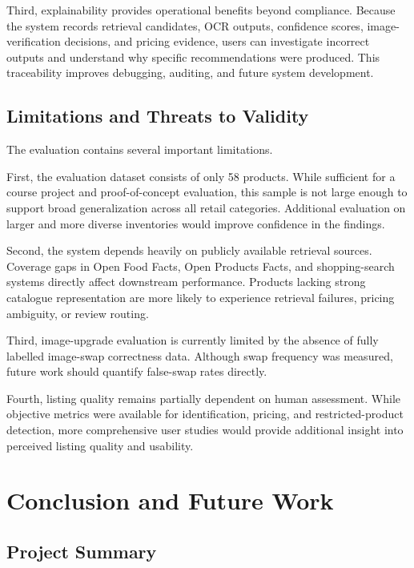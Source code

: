 \documentclass[conference]{IEEEtran}
\begin{document}
Third, explainability provides operational benefits beyond compliance.
Because the system records retrieval candidates, OCR outputs, confidence
scores, image-verification decisions, and pricing evidence, users can
investigate incorrect outputs and understand why specific recommendations
were produced. This traceability improves debugging, auditing, and future
system development. 

\subsection{Limitations and Threats to Validity}

The evaluation contains several important limitations.

First, the evaluation dataset consists of only 58 products. While sufficient
for a course project and proof-of-concept evaluation, this sample is not
large enough to support broad generalization across all retail categories.
Additional evaluation on larger and more diverse inventories would improve
confidence in the findings. 

Second, the system depends heavily on publicly available retrieval sources.
Coverage gaps in Open Food Facts, Open Products Facts, and shopping-search
systems directly affect downstream performance. Products lacking strong
catalogue representation are more likely to experience retrieval failures,
pricing ambiguity, or review routing. 

Third, image-upgrade evaluation is currently limited by the absence of
fully labelled image-swap correctness data. Although swap frequency was
measured, future work should quantify false-swap rates directly. 

Fourth, listing quality remains partially dependent on human assessment.
While objective metrics were available for identification, pricing, and
restricted-product detection, more comprehensive user studies would provide
additional insight into perceived listing quality and usability. 

\section{Conclusion and Future Work}
%
%


\subsection{Project Summary}
\end{document}
